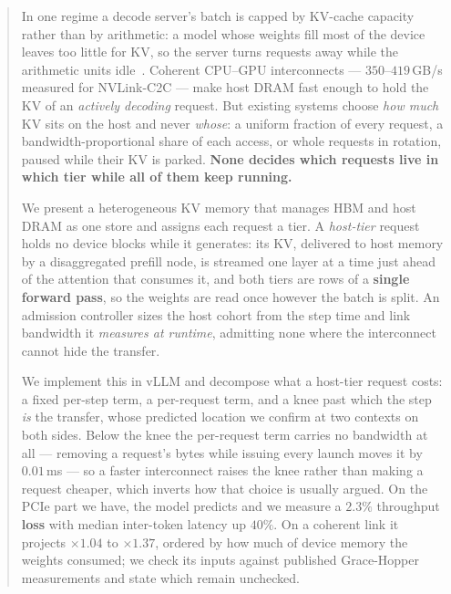 \begin{abstract}
In one regime a decode server's batch is capped by KV-cache capacity rather than
by arithmetic: a model whose weights fill most of the device leaves too little for
KV, so the server turns requests away while the arithmetic units
idle~\cite{bottlenecks}. Coherent CPU--GPU
interconnects --- $350$--$419$\,GB/s measured for NVLink-C2C --- make host DRAM fast
enough to hold the KV of an \emph{actively decoding} request. But existing systems
choose \emph{how much} KV sits on the host and never \emph{whose}: a uniform
fraction of every request, a bandwidth-proportional share of each access, or whole
requests in rotation, paused while their KV is parked. \textbf{None decides which
requests live in which tier while all of them keep running.}

We present a heterogeneous KV memory that manages HBM and host DRAM as one store and
assigns each request a tier. A \emph{host-tier} request holds no device blocks while
it generates: its KV, delivered to host memory by a disaggregated prefill node, is
streamed one layer at a time just ahead of the attention that consumes it, and both
tiers are rows of a \textbf{single forward pass}, so the weights are read once
however the batch is split. An admission controller sizes the
host cohort from the step time and link bandwidth it \emph{measures at runtime},
admitting none where the interconnect cannot hide the transfer.

We implement this in vLLM and decompose what a host-tier request costs: a fixed
per-step term, a per-request term, and a knee past which the step \emph{is} the
transfer, whose predicted location we confirm at two contexts on both sides. Below
the knee the per-request term carries no bandwidth at all --- removing a request's
bytes while issuing every launch moves it by $0.01$\,ms --- so a faster interconnect
raises the knee rather than making a request cheaper, which inverts how that choice
is usually argued. On the PCIe part we have, the model predicts and we measure a
$2.3\%$ throughput \textbf{loss} with median inter-token latency up $40\%$. On a
coherent link it projects $\times1.04$ to $\times1.37$, ordered by how much of
device memory the weights consumed; we check its inputs against published
Grace-Hopper measurements and state which remain unchecked.
\end{abstract}
